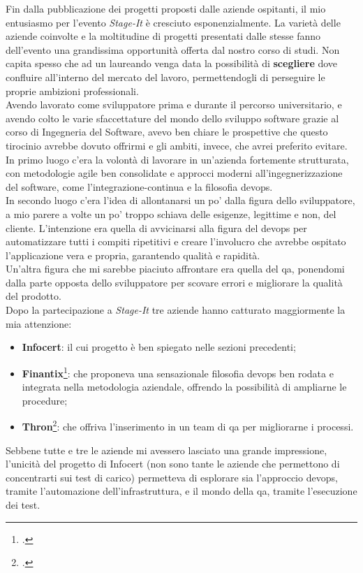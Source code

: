 Fin dalla pubblicazione dei progetti proposti dalle aziende ospitanti, il mio entusiasmo per l'evento \textit{Stage-It} è cresciuto esponenzialmente. La varietà delle aziende coinvolte e la moltitudine di progetti presentati dalle stesse fanno dell'evento una grandissima opportunità offerta dal nostro corso di studi. Non capita spesso che ad un laureando venga data la possibilità di \textbf{scegliere} dove confluire all'interno del mercato del lavoro, permettendogli di perseguire le proprie ambizioni professionali.\\
Avendo lavorato come sviluppatore prima e durante il percorso universitario, e avendo colto le varie sfaccettature del mondo dello sviluppo software grazie al corso di Ingegneria del Software, avevo ben chiare le prospettive che questo tirocinio avrebbe dovuto offrirmi e gli ambiti, invece, che avrei preferito evitare. \\
In primo luogo c'era la volontà di lavorare in un'azienda fortemente strutturata, con metodologie \gls{agile} ben consolidate e approcci moderni all'ingegnerizzazione del software, come l'\gls{integrazione-continua} e la filosofia \gls{devops}.\\
In secondo luogo c'era l'idea di allontanarsi un po' dalla figura dello sviluppatore, a mio parere a volte un po' troppo schiava delle esigenze, legittime e non, del cliente. L'intenzione era quella di avvicinarsi alla figura del \gls{devops} per automatizzare tutti i compiti ripetitivi e creare l'involucro che avrebbe ospitato l'applicazione vera e propria, garantendo qualità e rapidità.\\
Un'altra figura che mi sarebbe piaciuto affrontare era quella del \gls{qa}, ponendomi dalla parte opposta dello sviluppatore per scovare errori e migliorare la qualità del prodotto. \\
Dopo la partecipazione a \textit{Stage-It} tre aziende hanno catturato maggiormente la mia attenzione: 
\begin{itemize}
	\item \textbf{Infocert}: il cui progetto è ben spiegato nelle sezioni precedenti;
	\item \textbf{Finantix}\footcite{site:finantix}: che proponeva una sensazionale filosofia \gls{devops} ben rodata e integrata nella metodologia aziendale, offrendo la possibilità di ampliarne le procedure;
	\item \textbf{Thron}\footcite{site:thron}: che offriva l'inserimento in un team di \gls{qa} per migliorarne i processi.
\end{itemize}
Sebbene tutte e tre le aziende mi avessero lasciato una grande impressione, l'unicità del progetto di Infocert (non sono tante le aziende che permettono di concentrarti sui test di carico) permetteva di esplorare sia l'approccio \gls{devops}, tramite l'automazione dell'infrastruttura, e il mondo della \gls{qa}, tramite l'esecuzione dei test.
